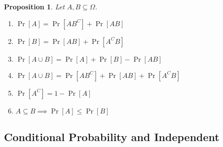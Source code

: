 \documentclass[12pt,openany]{book}
\newtheorem{proposition}[theorem]{Proposition}
\theoremstyle{definition}
\begin{document}
	\begin{tcolorbox}[colback=white,colframe=procolor,arc=5pt,title={\color{white}\bf}]
		\begin{proposition}
			Let $A,B\subseteq\Omega$. \begin{enumerate}[(1)]
				\item $\Pr[A]=\Pr[AB^C]+\Pr[AB]$
				\item $\Pr[B]=\Pr[AB]+\Pr[A^CB]$
				\item $\Pr[A\cup B]=\Pr[A]+\Pr[B]-\Pr[AB]$
				\item $\Pr[A\cup B]=\Pr[AB^C]+\Pr[AB]+\Pr[A^CB]$
				\item $\Pr[A^C]=1-\Pr[A]$
				\item $A\subseteq B\implies\Pr[A]\leq\Pr[B]$
			\end{enumerate}
		\end{proposition}
	\end{tcolorbox}
	
	\newpage
	\subsection{Conditional Probability and Independent}
	
\end{document}
